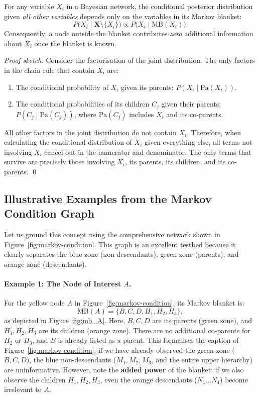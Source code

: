 \begin{theorem}
For any variable \(X_i\) in a Bayesian network, the conditional posterior distribution given \emph{all other variables} depends only on the variables in its Markov blanket:
\[
P\bigl(X_i \mid \mathbf{X} \setminus \{X_i\}\bigr) \propto P\bigl(X_i \mid \mathrm{MB}(X_i)\bigr).
\]
Consequently, a node outside the blanket contributes \emph{zero} additional information about \(X_i\) once the blanket is known.
\end{theorem}

\begin{proof}[Proof sketch]
Consider the factorisation of the joint distribution. The only factors in the chain rule that contain \(X_i\) are:
\begin{enumerate}
    \item The conditional probability of \(X_i\) given its parents: \(P(X_i \mid \mathrm{Pa}(X_i))\).
    \item The conditional probabilities of its children \(C_j\) given their parents: \(P(C_j \mid \mathrm{Pa}(C_j))\), where \(\mathrm{Pa}(C_j)\) includes \(X_i\) and its co-parents.
\end{enumerate}
All other factors in the joint distribution do not contain \(X_i\). Therefore, when calculating the conditional distribution of \(X_i\) given everything else, all terms not involving \(X_i\) cancel out in the numerator and denominator. The only terms that survive are precisely those involving \(X_i\), its parents, its children, and its co-parents. \qed
\end{proof}

\subsection{Illustrative Examples from the Markov Condition Graph}

Let us ground this concept using the comprehensive network shown in Figure~\ref{fig:markov-condition}. This graph is an excellent testbed because it clearly separates the blue zone (non-descendants), green zone (parents), and orange zone (descendants).

\paragraph{Example 1: The Node of Interest \(A\).}
For the yellow node \(A\) in Figure~\ref{fig:markov-condition}, its Markov blanket is:
\[
\mathrm{MB}(A) = \{B, C, D, H_1, H_2, H_3\},
\]
as depicted in Figure \ref{fig:mb_A}.
Here, \(B, C, D\) are its parents (green zone), and \(H_1, H_2, H_3\) are its children (orange zone). There are no additional co-parents for \(H_2\) or \(H_3\), and \(B\) is already listed as a parent.
This formalises the caption of Figure~\ref{fig:markov-condition}: if we have already observed the green zone (\(B, C, D\)), the blue non-descendants (\(M_1, M_2, M_3\), and the entire upper hierarchy) are uninformative. However, note the \textbf{added power} of the blanket: if we also observe the children \(H_1, H_2, H_3\), even the orange descendants (\(N_1...N_4\)) become irrelevant to \(A\).

